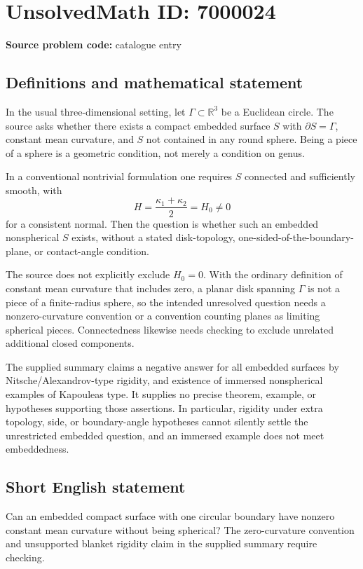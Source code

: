 \documentclass[11pt]{article}
\newcommand{\R}{\mathbb{R}}
\begin{document}
\section*{UnsolvedMath ID: 7000024}
\textbf{Source problem code:} catalogue entry
\subsection{Definitions and mathematical statement}
In the usual three-dimensional setting, let $\Gamma\subset\R^3$ be a Euclidean circle. The source asks whether there exists a compact embedded surface $S$ with $\partial S=\Gamma$, constant mean curvature, and $S$ not contained in any round sphere. Being a piece of a sphere is a geometric condition, not merely a condition on genus.

In a conventional nontrivial formulation one requires $S$ connected and sufficiently smooth, with
\[
H=\frac{\kappa_1+\kappa_2}{2}=H_0\ne0
\]
for a consistent normal. Then the question is whether such an embedded nonspherical $S$ exists, without a stated disk-topology, one-sided-of-the-boundary-plane, or contact-angle condition.

The source does not explicitly exclude $H_0=0$. With the ordinary definition of constant mean curvature that includes zero, a planar disk spanning $\Gamma$ is not a piece of a finite-radius sphere, so the intended unresolved question needs a nonzero-curvature convention or a convention counting planes as limiting spherical pieces. Connectedness likewise needs checking to exclude unrelated additional closed components.

The supplied summary claims a negative answer for all embedded surfaces by Nitsche/Alexandrov-type rigidity, and existence of immersed nonspherical examples of Kapouleas type. It supplies no precise theorem, example, or hypotheses supporting those assertions. In particular, rigidity under extra topology, side, or boundary-angle hypotheses cannot silently settle the unrestricted embedded question, and an immersed example does not meet embeddedness.
\subsection{Short English statement}
Can an embedded compact surface with one circular boundary have nonzero constant mean curvature without being spherical? The zero-curvature convention and unsupported blanket rigidity claim in the supplied summary require checking.
\end{document}
